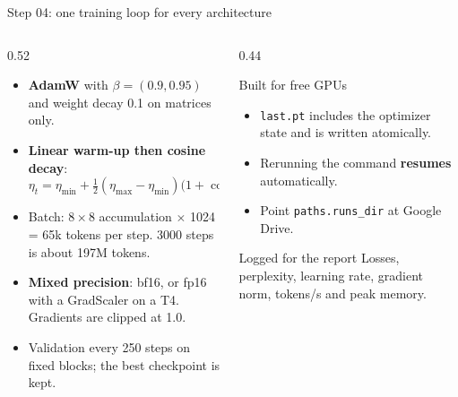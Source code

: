 \documentclass[aspectratio=169,11pt]{beamer}
\newcommand{\code}[1]{\texttt{\small #1}}
\begin{document}
\begin{frame}{Step 04: one training loop for every architecture}
  \begin{columns}[T]
    \begin{column}{0.52\textwidth}
      \small
      \begin{itemize}
        \item \textbf{AdamW} with $\beta=(0.9,0.95)$ and weight decay 0.1 on matrices only.
        \item \textbf{Linear warm-up then cosine decay}:
          \[
            \eta_t=\eta_{\min}+\tfrac12(\eta_{\max}-\eta_{\min})\big(1+\cos\pi\tfrac{t-t_w}{T-t_w}\big)
          \]
        \item Batch: $8\times 8$ accumulation $\times$ 1024 = 65k tokens per step. 3000 steps is about 197M tokens.
        \item \textbf{Mixed precision}: bf16, or fp16 with a GradScaler on a T4. Gradients are clipped at 1.0.
        \item Validation every 250 steps on fixed blocks; the best checkpoint is kept.
      \end{itemize}
    \end{column}
    \begin{column}{0.44\textwidth}
      \begin{block}{Built for free GPUs}
        \small
        \begin{itemize}
          \item \code{last.pt} includes the optimizer state and is written atomically.
          \item Rerunning the command \textbf{resumes} automatically.
          \item Point \code{paths.runs\_dir} at Google Drive.
        \end{itemize}
      \end{block}
      \begin{block}{Logged for the report}
        \small
        Losses, perplexity, learning rate, gradient norm, tokens/s and peak memory.
      \end{block}
    \end{column}
  \end{columns}
\end{frame}
\end{document}
